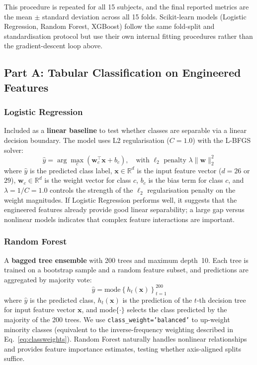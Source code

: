 \documentclass[11pt]{article}
\begin{document}
This procedure is repeated for all 15 subjects, and the final reported metrics are the mean $\pm$ standard deviation across all 15 folds.
Scikit-learn models (Logistic Regression, Random Forest, XGBoost) follow the same fold-split and standardisation protocol but use their own internal fitting procedures rather than the gradient-descent loop above.

\subsection{Part A: Tabular Classification on Engineered Features}

\subsubsection{Logistic Regression}
Included as a \textbf{linear baseline} to test whether classes are separable via a linear decision boundary.
The model uses L2 regularisation ($C = 1.0$) with the L-BFGS solver:
\begin{equation}
\hat{y} = \arg\max_{c} \left( \mathbf{w}_c^\top \mathbf{x} + b_c \right), \quad \text{with } \ell_2 \text{ penalty } \lambda \|\mathbf{w}\|_2^2
\end{equation}
where $\hat{y}$ is the predicted class label, $\mathbf{x} \in \mathbb{R}^d$ is the input feature vector ($d = 26$ or $29$), $\mathbf{w}_c \in \mathbb{R}^d$ is the weight vector for class $c$, $b_c$ is the bias term for class $c$, and $\lambda = 1/C = 1.0$ controls the strength of the $\ell_2$ regularisation penalty on the weight magnitudes.
If Logistic Regression performs well, it suggests that the engineered features already provide good linear separability; a large gap versus nonlinear models indicates that complex feature interactions are important.

\subsubsection{Random Forest}
A \textbf{bagged tree ensemble} with 200 trees and maximum depth~10.
Each tree is trained on a bootstrap sample and a random feature subset, and predictions are aggregated by majority vote:
\begin{equation}
\hat{y} = \text{mode}\left\{ h_t(\mathbf{x}) \right\}_{t=1}^{200}
\end{equation}
where $\hat{y}$ is the predicted class, $h_t(\mathbf{x})$ is the prediction of the $t$-th decision tree for input feature vector $\mathbf{x}$, and $\text{mode}\{\cdot\}$ selects the class predicted by the majority of the 200 trees.
We use \texttt{class\_weight='balanced'} to up-weight minority classes (equivalent to the inverse-frequency weighting described in Eq.~\ref{eq:classweights}).
Random Forest naturally handles nonlinear relationships and provides feature importance estimates, testing whether axis-aligned splits suffice.
\end{document}
